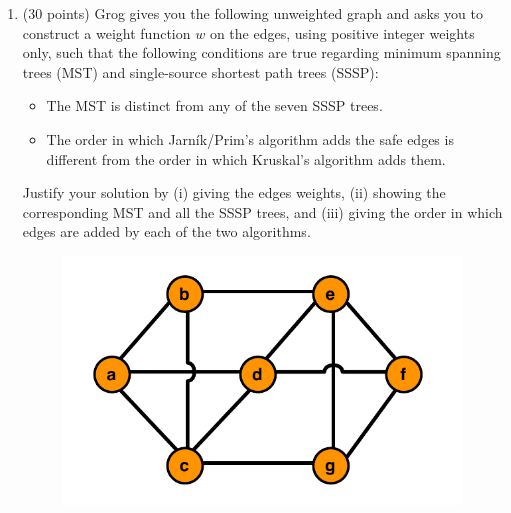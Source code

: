 \documentclass[12pt]{article}
\begin{document}
\renewcommand{\headrulewidth}{0.4pt}

\vspace{-3mm}
\begin{enumerate}
	\item (30 points) Grog gives you the following unweighted graph and asks you to construct a weight function $w$ on the edges, using positive integer weights only, such that the following conditions are true regarding minimum spanning trees (MST) and single-source shortest path trees (SSSP):
	\begin{itemize}
	\itemsep-0.1pt
	\item The MST is distinct from any of the seven SSSP trees.
	\item The order in which Jarn\'ik/Prim's algorithm adds the safe edges is different from the order in which Kruskal's algorithm adds them.
	\end{itemize}
	Justify your solution by (i) giving the edges weights, (ii) showing the corresponding MST and all the SSSP trees, and (iii) giving the order in which edges are added by each of the two algorithms.

    \begin{figure}[h!]
    \begin{center}
    \includegraphics[scale=0.7]{unweighted_graph.png} 
    \end{center}
    \end{figure}

    \pagebreak


\end{enumerate}
\end{document}
